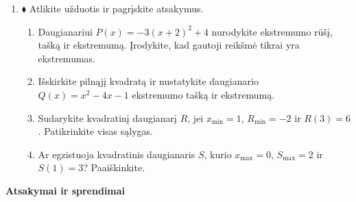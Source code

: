 \documentclass[12pt,a4paper]{article}
\begin{document}
\begin{enumerate}[resume]
\item $\blacklozenge$ Atlikite užduotis ir pagrįskite atsakymus.
\begin{enumerate}
\item Daugianariui $P(x)=-3(x+2)^2+4$ nurodykite ekstremumo rūšį, tašką ir ekstremumą. Įrodykite, kad gautoji reikšmė tikrai yra ekstremumas.
\item Išskirkite pilnąjį kvadratą ir nustatykite daugianario $Q(x)=x^2-4x-1$ ekstremumo tašką ir ekstremumą.
\item Sudarykite kvadratinį daugianarį $R$, jei $x_{\min}=1$, $R_{\min}=-2$ ir $R(3)=6$. Patikrinkite visas sąlygas.
\item Ar egzistuoja kvadratinis daugianaris $S$, kurio $x_{\max}=0$, $S_{\max}=2$ ir $S(1)=3$? Paaiškinkite.
\end{enumerate}
\end{enumerate}
\newpage
\begin{center}{\Large\bfseries Atsakymai ir sprendimai}\end{center}
\end{document}
